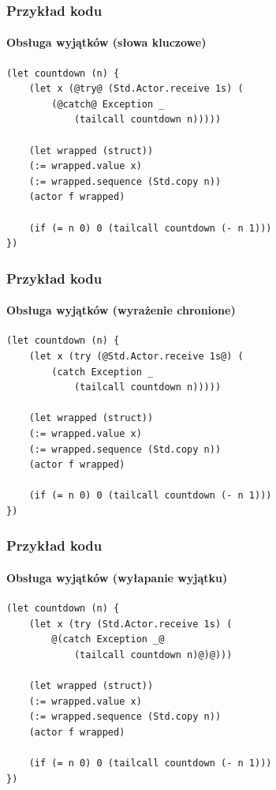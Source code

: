 \documentclass[aspectratio=169]{beamer}
\begin{document}
\begin{frame}[fragile]
    \frametitle{Przykład kodu}
    \framesubtitle{Obsługa wyjątków (słowa kluczowe)}

    \begin{small}
    \begin{lstlisting}
(let countdown (n) {
    (let x (@try@ (Std.Actor.receive 1s) (
        (@catch@ Exception _
            (tailcall countdown n)))))

    (let wrapped (struct))
    (:= wrapped.value x)
    (:= wrapped.sequence (Std.copy n))
    (actor f wrapped)

    (if (= n 0) 0 (tailcall countdown (- n 1)))
})
    \end{lstlisting}
    \end{small}
\end{frame}

\begin{frame}[fragile]
    \frametitle{Przykład kodu}
    \framesubtitle{Obsługa wyjątków (wyrażenie chronione)}

    \begin{small}
    \begin{lstlisting}
(let countdown (n) {
    (let x (try (@Std.Actor.receive 1s@) (
        (catch Exception _
            (tailcall countdown n)))))

    (let wrapped (struct))
    (:= wrapped.value x)
    (:= wrapped.sequence (Std.copy n))
    (actor f wrapped)

    (if (= n 0) 0 (tailcall countdown (- n 1)))
})
    \end{lstlisting}
    \end{small}
\end{frame}

\begin{frame}[fragile]
    \frametitle{Przykład kodu}
    \framesubtitle{Obsługa wyjątków (wyłapanie wyjątku)}

    \begin{small}
    \begin{lstlisting}
(let countdown (n) {
    (let x (try (Std.Actor.receive 1s) (
        @(catch Exception _@
            (tailcall countdown n)@)@)))

    (let wrapped (struct))
    (:= wrapped.value x)
    (:= wrapped.sequence (Std.copy n))
    (actor f wrapped)

    (if (= n 0) 0 (tailcall countdown (- n 1)))
})
    \end{lstlisting}
    \end{small}
\end{frame}
\end{document}
